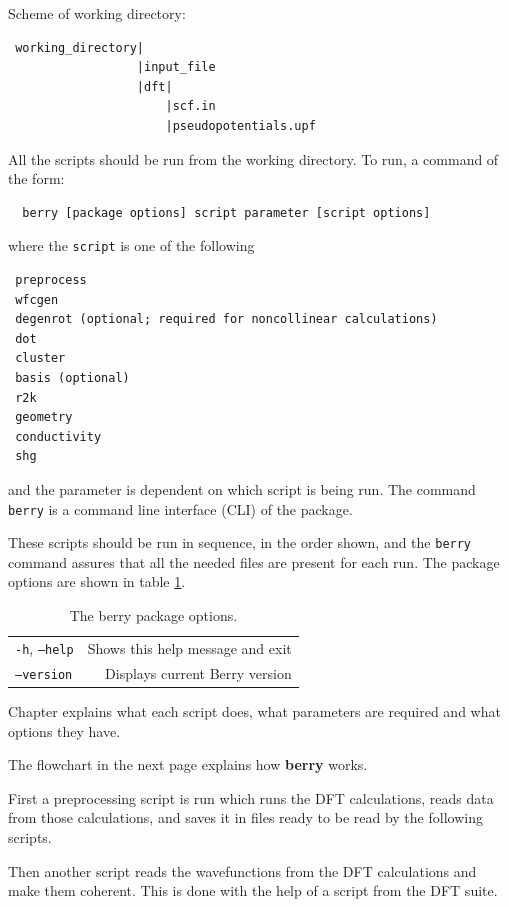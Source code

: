 \documentclass[a4paper,12pt]{report}
\begin{document}
Scheme of working directory:
\begin{verbatim}
 working_directory|
                  |input_file
                  |dft|
                      |scf.in
                      |pseudopotentials.upf
\end{verbatim}
\bigskip

 All the scripts should be run from the working directory.
 To run, a command of the form:
 \begin{verbatim}
  berry [package options] script parameter [script options]
 \end{verbatim}
where the \texttt{script} is one of the following
\begin{verbatim}
 preprocess
 wfcgen
 degenrot (optional; required for noncollinear calculations)
 dot
 cluster
 basis (optional)
 r2k
 geometry
 conductivity
 shg
\end{verbatim}
and the parameter is dependent on which script is being run.
The command \texttt{berry} is a command line interface (CLI) of the package.

These scripts should be run in sequence, in the order shown, and the \texttt{berry} command assures
that all the needed files are present for each run.
The package options are shown in table \ref{tab:package_options}.

\begin{table}[ht]
 \centering
 \caption{The berry package options.}\label{tab:package_options}
\begin{tabular}[]{lr}
\hline
  \texttt{-h}, \texttt{--help}     &    Shows this help message and exit \\
  \texttt{--version}               &    Displays current Berry version \\
\hline
\end{tabular}
\bigskip
\end{table}

Chapter  explains what each script does,
what parameters are required and what options they have.


The flowchart in the next page explains how \textbf{berry} works.

First a preprocessing script is run which runs the DFT calculations, reads data from those
calculations, and saves it in files ready to be read by the following scripts.

Then another script reads the wavefunctions from the DFT calculations and make them coherent.
This is done with the help of a script from the DFT suite.
\end{document}
